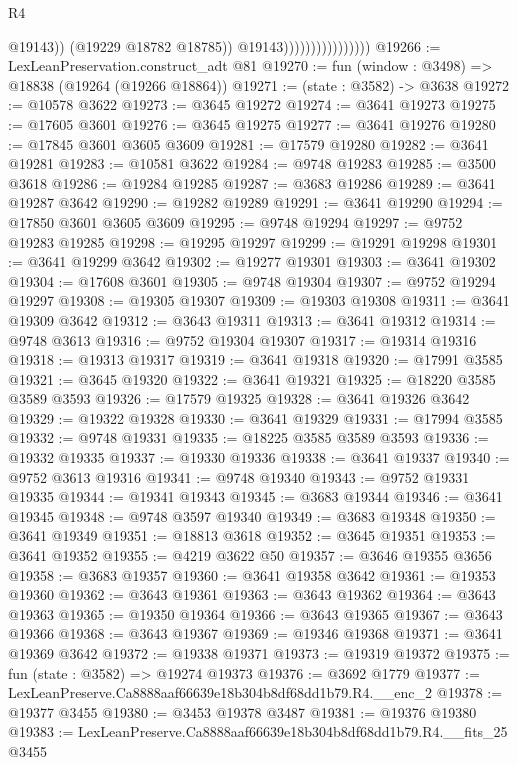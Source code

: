 \begin{lexlean}{R4}
\begin{coremodule}
                                          @19143))
                                      (@19229 @18782 @18785))
                                    @19143))))))))))))))))
@19266 := LexLeanPreservation.construct_adt @81
@19270 := fun (window : @3498) => @18838 (@19264 (@19266 @18864))
@19271 := (state : @3582) -> @3638
@19272 := @10578 @3622
@19273 := @3645 @19272
@19274 := @3641 @19273
@19275 := @17605 @3601
@19276 := @3645 @19275
@19277 := @3641 @19276
@19280 := @17845 @3601 @3605 @3609
@19281 := @17579 @19280
@19282 := @3641 @19281
@19283 := @10581 @3622
@19284 := @9748 @19283
@19285 := @3500 @3618
@19286 := @19284 @19285
@19287 := @3683 @19286
@19289 := @3641 @19287 @3642
@19290 := @19282 @19289
@19291 := @3641 @19290
@19294 := @17850 @3601 @3605 @3609
@19295 := @9748 @19294
@19297 := @9752 @19283 @19285
@19298 := @19295 @19297
@19299 := @19291 @19298
@19301 := @3641 @19299 @3642
@19302 := @19277 @19301
@19303 := @3641 @19302
@19304 := @17608 @3601
@19305 := @9748 @19304
@19307 := @9752 @19294 @19297
@19308 := @19305 @19307
@19309 := @19303 @19308
@19311 := @3641 @19309 @3642
@19312 := @3643 @19311
@19313 := @3641 @19312
@19314 := @9748 @3613
@19316 := @9752 @19304 @19307
@19317 := @19314 @19316
@19318 := @19313 @19317
@19319 := @3641 @19318
@19320 := @17991 @3585
@19321 := @3645 @19320
@19322 := @3641 @19321
@19325 := @18220 @3585 @3589 @3593
@19326 := @17579 @19325
@19328 := @3641 @19326 @3642
@19329 := @19322 @19328
@19330 := @3641 @19329
@19331 := @17994 @3585
@19332 := @9748 @19331
@19335 := @18225 @3585 @3589 @3593
@19336 := @19332 @19335
@19337 := @19330 @19336
@19338 := @3641 @19337
@19340 := @9752 @3613 @19316
@19341 := @9748 @19340
@19343 := @9752 @19331 @19335
@19344 := @19341 @19343
@19345 := @3683 @19344
@19346 := @3641 @19345
@19348 := @9748 @3597 @19340
@19349 := @3683 @19348
@19350 := @3641 @19349
@19351 := @18813 @3618
@19352 := @3645 @19351
@19353 := @3641 @19352
@19355 := @4219 @3622 @50
@19357 := @3646 @19355 @3656
@19358 := @3683 @19357
@19360 := @3641 @19358 @3642
@19361 := @19353 @19360
@19362 := @3643 @19361
@19363 := @3643 @19362
@19364 := @3643 @19363
@19365 := @19350 @19364
@19366 := @3643 @19365
@19367 := @3643 @19366
@19368 := @3643 @19367
@19369 := @19346 @19368
@19371 := @3641 @19369 @3642
@19372 := @19338 @19371
@19373 := @19319 @19372
@19375 := fun (state : @3582) => @19274 @19373
@19376 := @3692 @1779
@19377 := LexLeanPreserve.Ca8888aaf66639e18b304b8df68dd1b79.R4.__enc_2
@19378 := @19377 @3455
@19380 := @3453 @19378 @3487
@19381 := @19376 @19380
@19383 := LexLeanPreserve.Ca8888aaf66639e18b304b8df68dd1b79.R4.__fits_25 @3455

\end{coremodule}
\end{lexlean}
